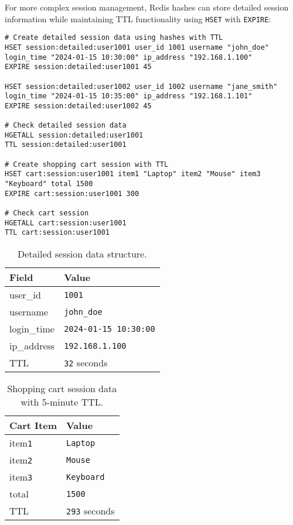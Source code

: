 For more complex session management, Redis hashes can store detailed session information while maintaining TTL functionality using \texttt{HSET} with \texttt{EXPIRE}:

\begin{verbatim}
# Create detailed session data using hashes with TTL
HSET session:detailed:user1001 user_id 1001 username "john_doe" login_time "2024-01-15 10:30:00" ip_address "192.168.1.100"
EXPIRE session:detailed:user1001 45

HSET session:detailed:user1002 user_id 1002 username "jane_smith" login_time "2024-01-15 10:35:00" ip_address "192.168.1.101"
EXPIRE session:detailed:user1002 45

# Check detailed session data
HGETALL session:detailed:user1001
TTL session:detailed:user1001

# Create shopping cart session with TTL
HSET cart:session:user1001 item1 "Laptop" item2 "Mouse" item3 "Keyboard" total 1500
EXPIRE cart:session:user1001 300

# Check cart session
HGETALL cart:session:user1001
TTL cart:session:user1001
\end{verbatim}

\begin{table}[H]
  \centering
  \begin{tabular}{|l|l|}
    \hline
    \textbf{Field} & \textbf{Value} \\
    \hline
    user\_id & \texttt{1001} \\
    username & \texttt{john\_doe} \\
    login\_time & \texttt{2024-01-15 10:30:00} \\
    ip\_address & \texttt{192.168.1.100} \\
    TTL & \texttt{32} seconds \\
    \hline
  \end{tabular}
  \caption{Detailed session data structure.}
\end{table}

\begin{table}[H]
  \centering
  \begin{tabular}{|l|l|}
    \hline
    \textbf{Cart Item} & \textbf{Value} \\
    \hline
    item\texttt{1} & \texttt{Laptop} \\
    item\texttt{2} & \texttt{Mouse} \\
    item\texttt{3} & \texttt{Keyboard} \\
    total & \texttt{1500} \\
    TTL & \texttt{293} seconds \\
    \hline
  \end{tabular}
  \caption{Shopping cart session data with 5-minute TTL.}
\end{table}

